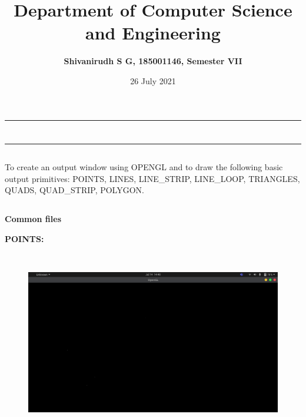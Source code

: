 \documentclass[12pt,letterpaper]{article}
\title{\textbf{Department of Computer Science and Engineering}}
\author{\textbf{Shivanirudh S G, 185001146, Semester VII }}
\date{26 July 2021}
\begin{document}
\maketitle
\hrule
\section*{}
\hrule 
\bigskip\bigskip

\subsection*{}

\subsection*{}
\begin{flushleft}
    To create an output window using OPENGL and to draw the following basic output primitives: POINTS, LINES, LINE\_STRIP, LINE\_LOOP, TRIANGLES, QUADS, QUAD\_STRIP, POLYGON.    
\end{flushleft}

\subsection*{}
\textbf{Common files}
\begin{flushleft}



\end{flushleft}
\newpage
\textbf{POINTS:}

\textbf{}
\begin{figure}[h]
    \centering
    \includegraphics[height=8cm, keepaspectratio]{Basics/Outputs/Points.png}
\end{figure}
\end{document}
